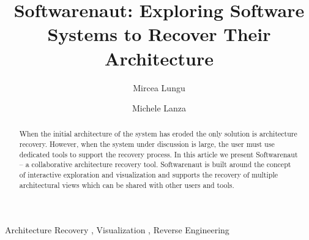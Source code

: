 \documentclass[preprint,12pt]{elsarticle}
\begin{document}
\begin{frontmatter}



\title{Softwarenaut: Exploring Software Systems to Recover Their Architecture}



\author{Mircea Lungu}
\address{Software Composition Group\\University of Bern, Switzerland}

\author{Michele Lanza}
\address{REVEAL \\University of Lugano, Switzerland}


\begin{abstract}
When the initial architecture of the system has eroded the 
only solution is architecture recovery. However, when the 
system under discussion is large, the user must use dedicated
tools to support the recovery process. In this article we present 
Softwarenaut -- a collaborative architecture recovery tool.
Softwarenaut is built around the concept of interactive exploration
and visualization and supports the recovery of multiple architectural
views which can be shared with other users and tools. 
\end{abstract}

\begin{keyword}
Architecture Recovery \sep
Visualization \sep
Reverse Engineering
\end{keyword}

\end{frontmatter}

\end{document}
